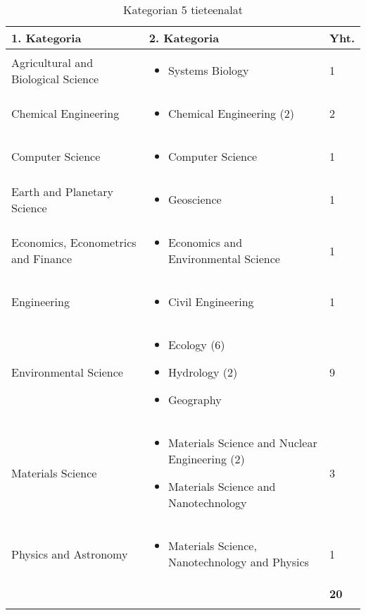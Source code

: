 \documentclass[utf8]{gradu3}
\begin{document}
\begin{longtable}[]{|p{5cm}|p{8cm}|p{1cm}|}
    \hline
    \textbf{1. Kategoria}    & \textbf{2. Kategoria} & \textbf{Yht.} \\
    \hline
    Agricultural and Biological Science  & \begin{itemize}
        \item Systems Biology
    \end{itemize} & 1 \\
    \hline
    Chemical Engineering & \begin{itemize}
        \item Chemical Engineering (2)
    \end{itemize} & 2 \\
    \hline
    Computer Science & \begin{itemize}
        \item Computer Science
    \end{itemize} & 1 \\
    \hline
    Earth and Planetary Science & \begin{itemize}
        \item Geoscience
    \end{itemize} & 1 \\
    \hline
    Economics, Econometrics and Finance & \begin{itemize}
        \item Economics and Environmental Science
    \end{itemize} & 1 \\
    \hline
    Engineering & \begin{itemize}
        \item Civil Engineering
    \end{itemize} & 1 \\
    \hline
    Environmental Science & \begin{itemize}
        \item Ecology (6)
        \item Hydrology (2)
        \item Geography
    \end{itemize} & 9 \\
    \hline
    Materials Science & \begin{itemize}
        \item Materials Science and Nuclear Engineering (2)
        \item Materials Science and Nanotechnology 
    \end{itemize} & 3 \\
    \hline
    Physics and Astronomy & \begin{itemize}
        \item Materials Science, Nanotechnology and Physics
    \end{itemize} & 1 \\
    \hline
       &   & \textbf{20} \\
    \hline
    \caption{Kategorian 5 tieteenalat}
    \label{table:Kategorian 5 tieteenalat}
\end{longtable}
\end{document}
